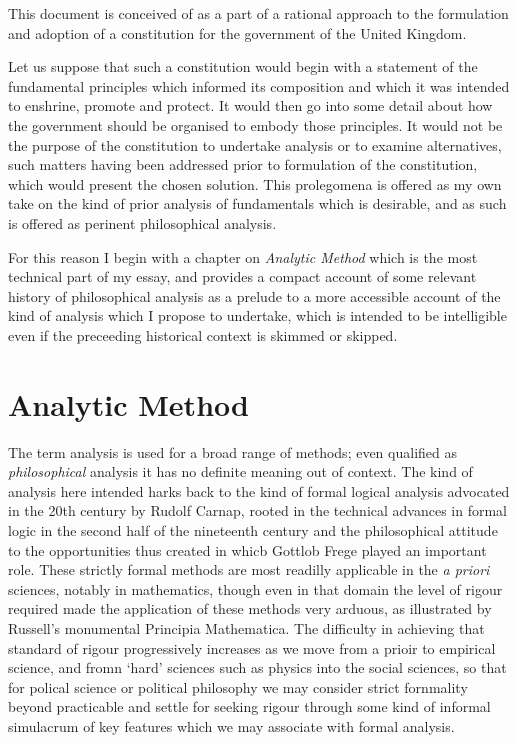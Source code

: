 \documentclass[10pt,titlepage]{book}
\begin{document}
This document is conceived of as a part of a rational approach to the formulation and
adoption of a constitution for the government of the United Kingdom.

Let us suppose that such a constitution would begin with a statement of the fundamental principles which informed its composition and which it was intended to enshrine, promote and protect.
It would then go into some detail about how the government should be organised to embody those principles.
It would not be the purpose of the constitution to undertake analysis or to examine alternatives, such matters having been addressed prior to formulation of the constitution, which would present the chosen solution.
This prolegomena is offered as my own take on the kind of prior analysis of fundamentals which is desirable, and as such is offered as perinent philosophical analysis.

For this reason I begin with a chapter on \emph{Analytic Method} which is the most technical part of my essay, and provides a compact account of some relevant history of philosophical analysis as a prelude to a more accessible account of the kind of analysis which I propose to undertake, which is intended to be intelligible even if the preceeding historical context is skimmed or skipped.

\chapter{Analytic Method}

The term analysis is used for a broad range of methods; even qualified as \emph{philosophical} analysis it has no definite meaning out of context.
The kind of analysis here intended harks back to the kind of formal logical analysis
advocated in the 20th century by Rudolf Carnap, rooted in the technical advances in
formal logic in the second half of the nineteenth century and the philosophical attitude to
the opportunities thus created in whicb Gottlob Frege played an important role.
These strictly formal methods are most readilly applicable in the \emph{a priori} sciences,
notably in mathematics, though even in that domain the level of rigour required made the
application of these methods very arduous, as illustrated by Russell’s monumental Principia
Mathematica. The difficulty in achieving that standard of rigour progressively increases as
we move from a prioir to empirical science, and fromn ‘hard’ sciences such as physics into
the social sciences, so that for polical science or political philosophy we may consider strict
fornmality beyond practicable and settle for seeking rigour through some kind of informal
simulacrum of key features which we may associate with formal analysis.
\end{document}
